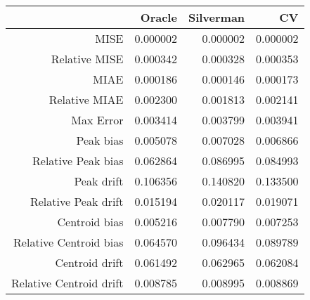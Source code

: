 \begin{tabular}{rrrr}
  \hline
 & Oracle & Silverman & CV \\ 
  \hline
MISE & 0.000002 & 0.000002 & 0.000002 \\ 
  Relative MISE & 0.000342 & 0.000328 & 0.000353 \\ 
  MIAE & 0.000186 & 0.000146 & 0.000173 \\ 
  Relative MIAE & 0.002300 & 0.001813 & 0.002141 \\ 
  Max Error & 0.003414 & 0.003799 & 0.003941 \\ 
  Peak bias & 0.005078 & 0.007028 & 0.006866 \\ 
  Relative Peak bias & 0.062864 & 0.086995 & 0.084993 \\ 
  Peak drift & 0.106356 & 0.140820 & 0.133500 \\ 
  Relative Peak drift & 0.015194 & 0.020117 & 0.019071 \\ 
  Centroid bias & 0.005216 & 0.007790 & 0.007253 \\ 
  Relative Centroid bias & 0.064570 & 0.096434 & 0.089789 \\ 
  Centroid drift & 0.061492 & 0.062965 & 0.062084 \\ 
  Relative Centroid drift & 0.008785 & 0.008995 & 0.008869 \\ 
   \hline
\end{tabular}
